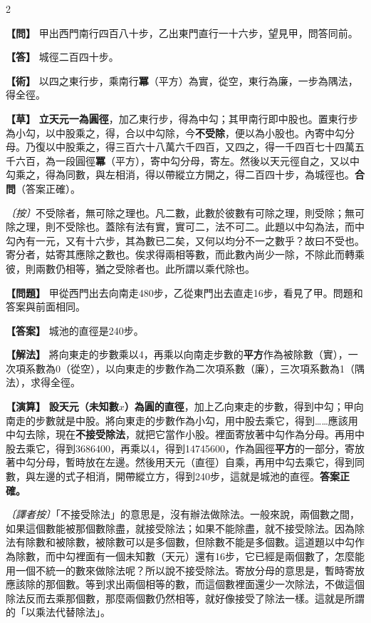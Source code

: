 \documentclass[11pt,a4paper]{article}
\newcommand{\wen}[1]{\par\noindent\textbf{\color{problemcolor}【問】} #1\par}
\newcommand{\da}[1]{\par\noindent\textbf{\color{problemcolor}【答】} #1\par}
\newcommand{\shu}[1]{\par\noindent\textbf{\color{problemcolor}【術】} #1\par}
\newcommand{\cao}[1]{\par\noindent\textbf{\color{problemcolor}【草】} #1\par}
\newcommand{\an}[1]{\par\noindent\textit{〔按〕}#1\par}
\newcommand{\wenm}[1]{\par\noindent\textbf{\color{problemcolor}【問題】} #1\par}
\newcommand{\dam}[1]{\par\noindent\textbf{\color{problemcolor}【答案】} #1\par}
\newcommand{\shum}[1]{\par\noindent\textbf{\color{problemcolor}【解法】} #1\par}
\newcommand{\caom}[1]{\par\noindent\textbf{\color{problemcolor}【演算】} #1\par}
\newcommand{\anm}[1]{\par\noindent\textit{〔譯者按〕}#1\par}
\begin{document}
\begin{paracol}{2}
\wen{甲出西門南行四百八十步，乙出東門直行一十六步，望見甲，問答同前。}

\da{城徑二百四十步。}

\shu{以四之東行步，乘南行\textbf{冪}（平方）為實，從空，東行為廉，一步為隅法，得全徑。}

\cao{\textbf{立天元一為圓徑}，加乙東行步，得為中勾；其甲南行即中股也。置東行步為小勾，以中股乘之，得，合以中勾除，今\textbf{不受除}，便以為小股也。內寄中勾分母。乃復以中股乘之，得三百六十八萬六千四百，又四之，得一千四百七十四萬五千六百，為一段圓徑\textbf{冪}（平方），寄中勾分母，寄左。然後以天元徑自之，又以中勾乘之，得為同數，與左相消，得以帶縱立方開之，得二百四十步，為城徑也。\textbf{合問}（答案正確）。}

\an{不受除者，無可除之理也。凡二數，此數於彼數有可除之理，則受除；無可除之理，則不受除也。蓋除有法有實，實可二，法不可二。此題以中勾為法，而中勾內有一元，又有十六步，其為數已二矣，又何以均分不一之數乎？故曰不受也。寄分者，姑寄其應除之數也。俟求得兩相等數，而此數內尚少一除，不除此而轉乘彼，則兩數仍相等，猶之受除者也。此所謂以乘代除也。}

\switchcolumn
\wenm{甲從西門出去向南走480步，乙從東門出去直走16步，看見了甲。問題和答案與前面相同。}

\dam{城池的直徑是240步。}

\shum{將向東走的步數乘以4，再乘以向南走步數的\textbf{平方}作為被除數（實），一次項系數為0（從空），以向東走的步數作為二次項系數（廉），三次項系數為1（隅法），求得全徑。}

\caom{\textbf{設天元（未知數$x$）為圓的直徑}，加上乙向東走的步數，得到中勾；甲向南走的步數就是中股。將向東走的步數作為小勾，用中股去乘它，得到……應該用中勾去除，現在\textbf{不接受除法}，就把它當作小股。裡面寄放著中勾作為分母。再用中股去乘它，得到3686400，再乘以4，得到14745600，作為圓徑\textbf{平方}的一部分，寄放著中勾分母，暫時放在左邊。然後用天元（直徑）自乘，再用中勾去乘它，得到同數，與左邊的式子相消，開帶縱立方，得到240步，這就是城池的直徑。\textbf{答案正確。}}

\anm{「不接受除法」的意思是，沒有辦法做除法。一般來說，兩個數之間，如果這個數能被那個數除盡，就接受除法；如果不能除盡，就不接受除法。因為除法有除數和被除數，被除數可以是多個數，但除數不能是多個數。這道題以中勾作為除數，而中勾裡面有一個未知數（天元）還有16步，它已經是兩個數了，怎麼能用一個不統一的數來做除法呢？所以說不接受除法。寄放分母的意思是，暫時寄放應該除的那個數。等到求出兩個相等的數，而這個數裡面還少一次除法，不做這個除法反而去乘那個數，那麼兩個數仍然相等，就好像接受了除法一樣。這就是所謂的「以乘法代替除法」。}
\end{paracol}
\end{document}
